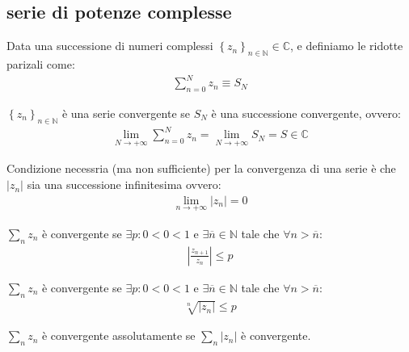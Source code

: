 \documentclass[a4paper, oneside]{article}
\begin{document}
    \subsection{serie di potenze complesse}
    \begin{definition}
        Data una successione di numeri complessi $\left\{z_n\right\} _{n \in \mathbb{N}} \in \mathbb{C}$, e definiamo le ridotte parizali come:
        \begin{gather*}
            \sum_{n=0}^N z_n \equiv S_N
        \end{gather*}
    \end{definition}
    \begin{definition}
        $\left\{z_n\right\} _{n \in \mathbb{N}}$ è una serie convergente se $S_N$ è una successione convergente, ovvero:
        \begin{gather*}
            \lim_{N \to +\infty} \sum_{n=0}^N z_n = \lim_{N \to +\infty} S_N = S \in \mathbb{C}
        \end{gather*}
    \end{definition}
    \begin{theorem}
        Condizione necessria (ma non sufficiente) per la convergenza di una serie è che $|z_n|$ sia una successione infinitesima ovvero:
        \begin{gather*}
            \lim_{n \to +\infty} |z_n| = 0
        \end{gather*}
    \end{theorem}
    \begin{theorem}
        $\sum_n z_n$ è convergente se $\exists p : 0<0<1$ e $\exists \overline{n} \in \mathbb{N}$ tale che $\forall n > \overline{n}$:
        \begin{gather*}
            \left\lvert \frac{z_{n+1}}{z_n} \right\rvert \leq p
        \end{gather*}
    \end{theorem}
    \begin{theorem}
        $\sum_n z_n$ è convergente se $\exists p : 0<0<1$ e $\exists \overline{n} \in \mathbb{N}$ tale che $\forall n > \overline{n}$:
        \begin{gather*}
            \sqrt[n]{|z_n|} \leq p
        \end{gather*}
    \end{theorem}
    \begin{definition}
        $\sum_n z_n$ è convergente assolutamente se $\sum_n |z_n|$ è convergente.
    \end{definition}
\end{document}
